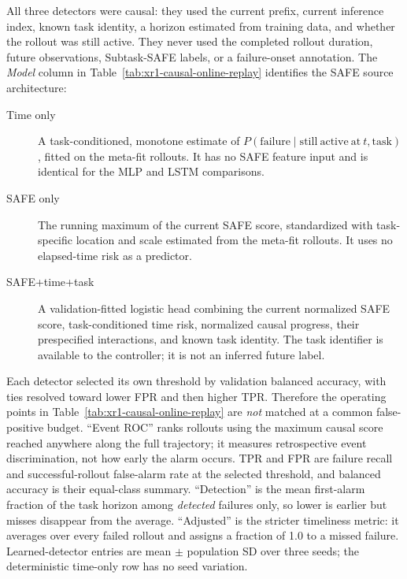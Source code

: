 \documentclass[11pt,a4paper]{article}
\begin{document}
All three detectors were causal: they used the current prefix, current
inference index, known task identity, a horizon estimated from training data,
and whether the rollout was still active. They never used the completed
rollout duration, future observations, Subtask-SAFE labels, or a failure-onset
annotation. The \emph{Model} column in Table~\ref{tab:xr1-causal-online-replay}
identifies the SAFE source architecture:
\begin{description}
\item[Time only] A task-conditioned, monotone estimate of
$P(\mathrm{failure}\mid\mathrm{still\ active\ at\ }t,\mathrm{task})$, fitted on
the meta-fit rollouts. It has no SAFE feature input and is identical for the
MLP and LSTM comparisons.
\item[SAFE only] The running maximum of the current SAFE score, standardized
with task-specific location and scale estimated from the meta-fit rollouts.
It uses no elapsed-time risk as a predictor.
\item[SAFE+time+task] A validation-fitted logistic head combining the current
normalized SAFE score, task-conditioned time risk, normalized causal progress,
their prespecified interactions, and known task identity. The task identifier
is available to the controller; it is not an inferred future label.
\end{description}

Each detector selected its own threshold by validation balanced accuracy, with
ties resolved toward lower FPR and then higher TPR. Therefore the operating
points in Table~\ref{tab:xr1-causal-online-replay} are \emph{not} matched at a
common false-positive budget. ``Event ROC'' ranks rollouts using the maximum
causal score reached anywhere along the full trajectory; it measures
retrospective event discrimination, not how early the alarm occurs. TPR and
FPR are failure recall and successful-rollout false-alarm rate at the selected
threshold, and balanced accuracy is their equal-class summary. ``Detection''
is the mean first-alarm fraction of the task horizon among \emph{detected}
failures only, so lower is earlier but misses disappear from the average.
``Adjusted'' is the stricter timeliness metric: it averages over every failed
rollout and assigns a fraction of 1.0 to a missed failure. Learned-detector
entries are mean $\pm$ population SD over three seeds; the deterministic
time-only row has no seed variation.
\end{document}
